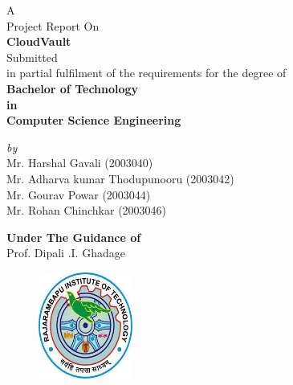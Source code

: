 \begin{titlepage}
\enlargethispage{3cm}

\begin{center}


A \\
\vspace*{0.2cm}
Project Report On\\ 
\vspace*{1cm}
 \textbf{\Large CloudVault}\\[10pt]
 Submitted  \\
\vspace*{0.2cm}
in partial fulfilment of the requirements for the degree of\\

\vspace*{0.2cm}
{ \bf Bachelor of Technology } \\
\vspace{0.2cm}
{ \bf in }\\
\vspace{0.2cm}
{ \bf Computer Science Engineering}\\
\vspace{0.2cm}

                   {\em  by} \\ 
                   \vspace{2mm}
             {  Mr. Harshal Gavali (2003040)} \\
              \vspace{1mm} 
             {  Mr. Adharva kumar
Thodupunooru (2003042) } \\
              \vspace{1mm} 
             {  Mr. Gourav Powar (2003044)} \\
              \vspace{1mm}
             {  Mr. Rohan Chinchkar (2003046)} \\
              \vspace{7mm}
             
{\bf Under The Guidance of}\\
{ Prof. Dipali .I. Ghadage }
\vspace{0.3cm}

\begin{figure}[h]
  \begin{center}
  \includegraphics[height=35mm]{Images_Cloud/logo.png}
  \end{center}
\end{figure}


\end{center}
\end{titlepage}
